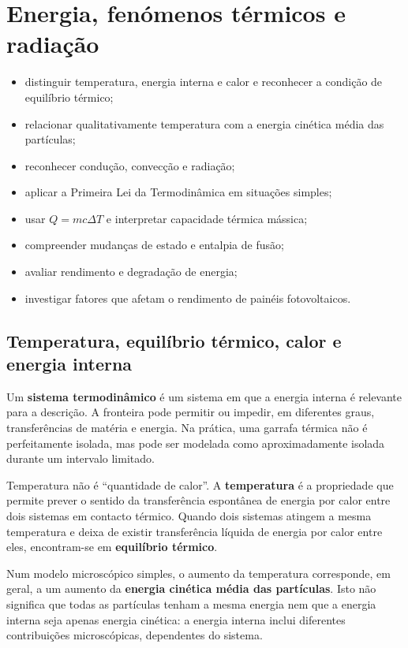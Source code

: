 \documentclass[11pt,a4paper,oneside]{book}
\begin{document}
\chapter{Energia, fenómenos térmicos e radiação}

\begin{objetivos}
\begin{itemize}
  \item distinguir temperatura, energia interna e calor e reconhecer a condição de equilíbrio térmico;
  \item relacionar qualitativamente temperatura com a energia cinética média das partículas;
  \item reconhecer condução, convecção e radiação;
  \item aplicar a Primeira Lei da Termodinâmica em situações simples;
  \item usar $Q=mc\Delta T$ e interpretar capacidade térmica mássica;
  \item compreender mudanças de estado e entalpia de fusão;
  \item avaliar rendimento e degradação de energia;
  \item investigar fatores que afetam o rendimento de painéis fotovoltaicos.
\end{itemize}
\end{objetivos}

\section{Temperatura, equilíbrio térmico, calor e energia interna}
Um \textbf{sistema termodinâmico} é um sistema em que a energia interna é relevante para a descrição. A fronteira pode permitir ou impedir, em diferentes graus, transferências de matéria e energia. Na prática, uma garrafa térmica não é perfeitamente isolada, mas pode ser modelada como aproximadamente isolada durante um intervalo limitado.

Temperatura não é ``quantidade de calor''. A \textbf{temperatura} é a propriedade que permite prever o sentido da transferência espontânea de energia por calor entre dois sistemas em contacto térmico. Quando dois sistemas atingem a mesma temperatura e deixa de existir transferência líquida de energia por calor entre eles, encontram-se em \textbf{equilíbrio térmico}.

Num modelo microscópico simples, o aumento da temperatura corresponde, em geral, a um aumento da \textbf{energia cinética média das partículas}. Isto não significa que todas as partículas tenham a mesma energia nem que a energia interna seja apenas energia cinética: a energia interna inclui diferentes contribuições microscópicas, dependentes do sistema.
\end{document}
